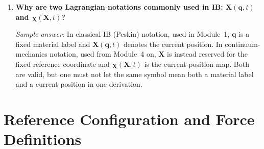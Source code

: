 \documentclass[11pt]{article}
\begin{document}
\begin{enumerate}[label=\arabic*.]
\item \textbf{Why are two Lagrangian notations commonly used in IB: $\mathbf{X}(\mathbf{q},t)$ and $\boldsymbol{\chi}(\mathbf{X},t)$?}

\textit{Sample answer:}
In classical IB (Peskin) notation, used in Module~1, $\mathbf{q}$ is a fixed
material label and $\mathbf{X}(\mathbf{q},t)$ denotes the current position. In
continuum-mechanics notation, used from Module~4 on, $\mathbf{X}$ is instead
reserved for the fixed reference coordinate and $\boldsymbol{\chi}(\mathbf{X},t)$
is the current-position map. Both are valid,
but one must not let the same symbol mean both a material label and a current
position in one derivation.

\end{enumerate}

\section*{Reference Configuration and Force Definitions}
\end{document}
